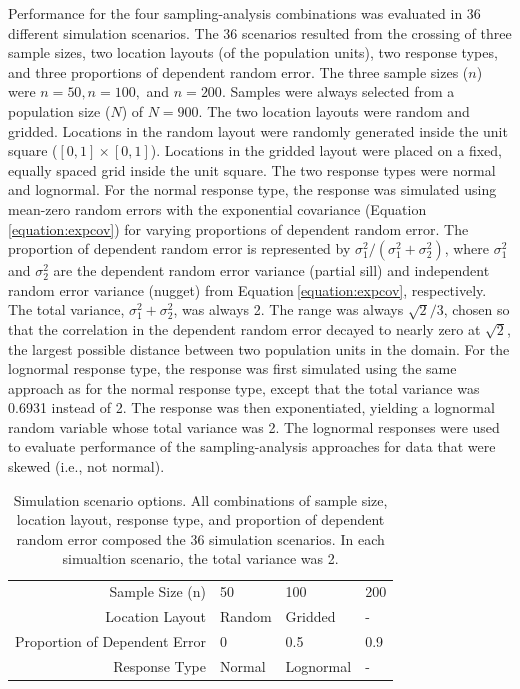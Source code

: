 \documentclass[]{elsarticle} %
\begin{document}
Performance for the four sampling-analysis combinations was evaluated in
36 different simulation scenarios. The 36 scenarios resulted from the
crossing of three sample sizes, two location layouts (of the population
units), two response types, and three proportions of dependent random
error. The three sample sizes (\(n\)) were \(n = 50, n = 100,\) and
\(n = 200\). Samples were always selected from a population size (\(N\))
of \(N = 900\). The two location layouts were random and gridded.
Locations in the random layout were randomly generated inside the unit
square (\([0, 1] \times [0, 1]\)). Locations in the gridded layout were
placed on a fixed, equally spaced grid inside the unit square. The two
response types were normal and lognormal. For the normal response type,
the response was simulated using mean-zero random errors with the
exponential covariance (Equation\(~\)\ref{equation:expcov}) for varying
proportions of dependent random error. The proportion of dependent
random error is represented by
\(\sigma^2_1 / (\sigma^2_1 + \sigma^2_2)\), where \(\sigma^2_1\) and
\(\sigma^2_2\) are the dependent random error variance (partial sill)
and independent random error variance (nugget) from
Equation\(~\)\ref{equation:expcov}, respectively. The total variance,
\(\sigma^2_1 + \sigma^2_2\), was always 2. The range was always
\(\sqrt{2} / 3\), chosen so that the correlation in the dependent random
error decayed to nearly zero at \(\sqrt{2}\), the largest possible
distance between two population units in the domain. For the lognormal
response type, the response was first simulated using the same approach
as for the normal response type, except that the total variance was
0.6931 instead of 2. The response was then exponentiated, yielding a
lognormal random variable whose total variance was 2. The lognormal
responses were used to evaluate performance of the sampling-analysis
approaches for data that were skewed (i.e., not normal).

\begin{table}[ht]
\centering
\begin{tabular}{r|lll}
   \hline
Sample Size (n) & 50 & 100 & 200 \\ 
  Location Layout & Random & Gridded & - \\ 
  Proportion of Dependent Error & 0 & 0.5 & 0.9 \\ 
  Response Type & Normal & Lognormal & - \\ 
   \hline
\end{tabular}
\caption{\label{tab:parmtab} Simulation scenario options. All combinations of sample size, location layout, response type, and proportion of dependent random error composed the 36 simulation scenarios. In each simualtion scenario, the total variance was 2.} 
\end{table}
\end{document}
